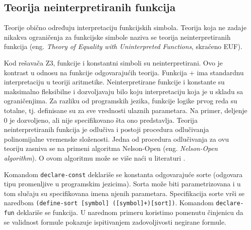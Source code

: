 \documentclass[12pt,oneside]{memoir}
\begin{document}
\subsection{Teorija neinterpretiranih funkcija}
Teorije obično određuju interpretaciju funkcijskih simbola. Teorija koja ne zadaje nikakva ograničenja za funkcijske simbole naziva se teorija neinterpretiranih funkcija 
(eng. \textit{Theory of Equality with Uninterpreted Functions}, skraćeno EUF). \par Kod rešavača Z3, funkcije i konstantni simboli su neinterpretirani. Ovo je kontrast u odnosu na funkcije odgovarajućih teorija. Funkcija + ima standardnu interpretaciju u teoriji aritmetike. Neinterpretirane funkcije i konstante su maksimalno fleksibilne i dozvoljavaju bilo koju interpretaciju koja je u skladu sa ograničenjima. Za razliku od programskih jezika, funkcije logike prvog reda su totalne, tj. definisane su za sve vrednosti ulaznih parametara. Na primer, deljenje 0 je dozvoljeno, ali nije specifikovano šta ono predstavlja. Teorija neinterpretiranih funkcija je odlučiva i postoji procedura odlučivanja polinomijalne vremenske složenosti. Jedna od procedura odlučivanja za ovu teoriju zasniva se na primeni algoritma Nelson-Open (eng. \textit{Nelson-Open algorithm}). O ovom algoritmu može se više naći u literaturi \cite{NelsonOpen}.
\par

Komandom \texttt{declare-const} deklariše se konstanta odgovarajuće sorte (odgovara tipu promenljive u programskim jezicima). Sorta može biti parametrizovana i u tom slučaju su specifikovana imena njenih parametara. Specifikacija sorte vrši se naredbom \texttt{(define-sort [symbol] ([symbol]+)[sort])}.
Komandom \texttt{declare-fun} deklariše se funkcija. 
U narednom primeru koristimo pomenutu činjenicu da se validnost formule pokazuje ispitivanjem zadovoljivosti negirane formule. 
\end{document}
